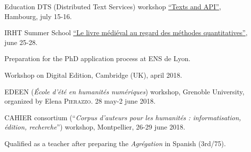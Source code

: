 \begin{rubric}{Education}
                                \entry*
                             DTS (Distributed Text Services) workshop \href{https://distributed-text-services.github.io/workshops/events/2019-hamburg/}{\enquote{Texts and API}}, Hambourg, july 15-16.
                    
                                \entry*
                            IRHT Summer School \href{https://www.irht.cnrs.fr/?q=fr/agenda/le-livre-medieval-au-regard-des-methodes-quantitatives-0}{\enquote{Le livre médiéval au regard des méthodes
                        quantitatives}}, june 25-28.
                    
                                \entry*[2017-2018]
                            Preparation for the PhD application process at ENS de Lyon.
                    
                                \entry*
                            Workshop on Digital Edition, Cambridge (UK), april 2018.
                    
                                 EDEEN (\textit{École d'été en humanités numériques}) workshop, Grenoble
                        University, organized by Elena \textsc{Pierazzo}. 28 may-2 june
                        2018.
                    
                                 CAHIER consortium (\enquote{\textit{Corpus d’auteurs pour les humanités :
                                informatisation, édition, recherche}}) workshop, Montpellier,
                        26-29 june 2018.
                    
                                \entry*[2016-2017]
                            Qualified as a teacher after preparing the \textit{Agrégation} in Spanish
                        (3rd/75).
                    

\end{rubric}
